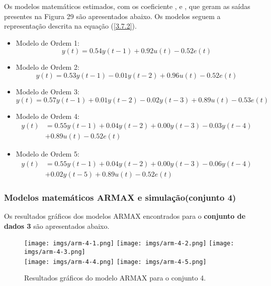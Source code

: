 \documentclass[a4paper,12pt]{article}
\begin{document}
Os modelos matemáticos estimados, com os coeficiente ,  e , que geram as saídas presentes na Figura 29 são apresentados abaixo. Os modelos seguem a representação descrita na equação (\ref{3.7.2}).
\begin{itemize}
    \item Modelo de Ordem 1:
    \begin{equation*}
    y(t) = 0.54y(t-1) + 0.92u(t) - 0.52e(t)
    \end{equation*}
    
    \item Modelo de Ordem 2:
    \begin{equation*}
    y(t) = 0.53y(t-1) - 0.01y(t-2) + 0.96u(t) - 0.52e(t)
    \end{equation*}
    
    \item Modelo de Ordem 3:
    \begin{equation*}
    y(t) = 0.57y(t-1) + 0.01y(t-2) - 0.02y(t-3) + 0.89u(t) - 0.53e(t)
    \end{equation*}
    
    \item Modelo de Ordem 4:
    \begin{align}
    y(t) &= 0.55y(t-1) + 0.04y(t-2) + 0.00y(t-3) - 0.03y(t-4) \nonumber\\
    &+ 0.89u(t) - 0.52e(t) \nonumber
    \end{align}
    
    \item Modelo de Ordem 5:
    \begin{align}
    y(t) &= 0.55y(t-1) + 0.04y(t-2) + 0.00y(t-3) - 0.06y(t-4)\nonumber \\
    &+ 0.02y(t-5) + 0.89u(t) - 0.52e(t) \nonumber
    \end{align}
\end{itemize}


\subsubsection{Modelos matemáticos ARMAX e simulação(conjunto 4)}
Os resultados gráficos dos modelos ARMAX encontrados para o \textbf{conjunto de dados 3} são apresentados abaixo.

\begin{figure}[h!]
\centering

\texttt{[image: imgs/arm-4-1.png]} \quad
\texttt{[image: imgs/arm-4-2.png]} \quad
\texttt{[image: imgs/arm-4-3.png]} \\

\texttt{[image: imgs/arm-4-4.png]} \quad
\texttt{[image: imgs/arm-4-5.png]}

\caption{Resultados gráficos do modelo ARMAX para o conjunto 4.}
\end{figure}
\end{document}
